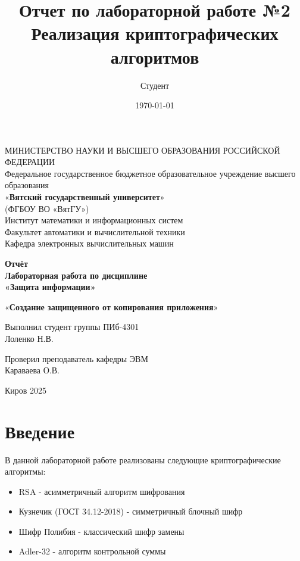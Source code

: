 \documentclass[a4paper, 14pt]{extarticle}
\title{Отчет по лабораторной работе №2\\
Реализация криптографических алгоритмов}
\author{Студент}
\date{\today}
\begin{document}
\begin{center}
МИНИСТЕРСТВО НАУКИ И ВЫСШЕГО ОБРАЗОВАНИЯ РОССИЙСКОЙ ФЕДЕРАЦИИ \\
Федеральное государственное бюджетное образовательное учреждение высшего образования \\
«\textbf{Вятский государственный университет}» \\
(ФГБОУ ВО «ВятГУ») \\
Институт математики и информационных систем \\
Факультет автоматики и вычислительной техники \\
Кафедра электронных вычислительных машин

\vspace*{35mm}

\textbf{\Large Отчёт \\
Лабораторная работа по дисциплине \\
«Защита информации»}

\vspace*{5mm}
«\textbf{Создание защищенного от копирования приложения}»

\vspace*{11mm}

\begin{flushright}
Выполнил студент группы ПИб-4301 \\
Лоленко Н.В.\\

\vspace{5mm}

Проверил преподаватель кафедры ЭВМ \\ Караваева О.В.\\
\end{flushright}

\vspace*{45mm}

Киров 2025
\end{center}

\maketitle

\section{Введение}
В данной лабораторной работе реализованы следующие криптографические алгоритмы:
\begin{itemize}
    \item RSA - асимметричный алгоритм шифрования
    \item Кузнечик (ГОСТ 34.12-2018) - симметричный блочный шифр
    \item Шифр Полибия - классический шифр замены
    \item Adler-32 - алгоритм контрольной суммы
\end{itemize}
\end{document}
